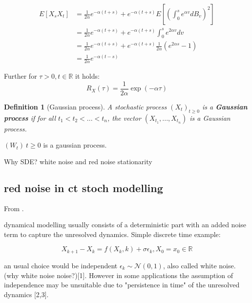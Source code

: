\documentclass[%
thesis=student,%
coverpage=false,%
titlepage=false,%
headmarks=true, %
german,%
font=libertine, %
math=newpxtx, %
BCOR=5mm,%
coverBCOR=11mm%
]{tumbook}
\newtheorem{definition}{Definition}[section]
\begin{document}
\begin{subequations}
    \begin{align*}
        E[X_{s}X_{t}] &= \frac{1}{2\alpha}e^{-\alpha(t+s)} + e^{-\alpha(t+s)}E[(\int_{0}^{s}e^{\alpha v}dB_{v})^{2}]   \\
         &= \frac{1}{2\alpha}e^{-\alpha(t+s)} + e^{-\alpha(t+s)}\int_{0}^{s}e^{2\alpha v}dv \\
         &= \frac{1}{2\alpha}e^{-\alpha(t+s)} + e^{-\alpha(t+s)}\frac{1}{2\alpha}(e^{2\alpha s} - 1) \\
         &= \frac{1}{2\alpha}e^{-\alpha(t-s)} 
    \end{align*}
\end{subequations}   

Further for $\tau > 0, t \in \mathbb{R}$ it holds:
\[
R_{X}(\tau) =  \frac{1}{2\alpha}\exp(-\alpha\tau)
\]







\begin{definition}[Gaussian process]
    A stochastic process $(X_{t})_{t\geq 0}$ is a \textbf{Gaussian process} if for all $t_{1} < t_{2} < ... < t_{n}$, the vector $(X_{t_{1}},...,X_{t_{n}})$ is a Gaussian process.
\end{definition}

$(W_{t}) \ t \geq 0$ is a gaussian process.



Why SDE?
white noise and red noise
stationarity

\subsection{red noise in ct stoch modelling}
From \cite{Morr:2022}.

dynamical modelling usually consists of a deterministic part with an added noise term to capture the unresolved dynamics. Simple discrete time example:

\begin{equation}
    X_{k+1}-X_{k} = f(X_{k},k) + \sigma\epsilon_{k}, X_{0} = x_{0} \in \mathbb{R}
\end{equation}


an usual choice would be independent $\epsilon_{k} \sim \mathcal{N}(0,1)$, also called white noise. (why white noise noise?)[1].
However in some applications the assumption of independence may be unsuitable due to "persistence in time" of the unresolved dynamics [2,3].
\end{document}
